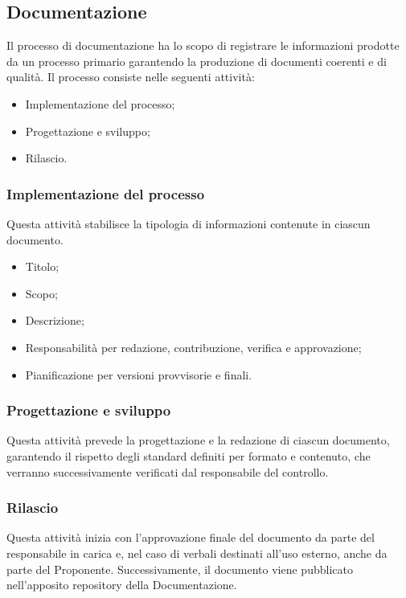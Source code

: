 \subsection{Documentazione}
\label{subsec:documentazione}
Il processo di documentazione ha lo scopo di registrare le informazioni prodotte da un processo primario garantendo la produzione di documenti coerenti e di qualità.
Il processo consiste nelle seguenti attività:
\begin{itemize}
    \item Implementazione del processo;
    \item Progettazione e sviluppo;
    \item Rilascio.
\end{itemize}

\subsubsection{Implementazione del processo}
\label{subsubsec:implementazione_processo}
Questa attività stabilisce la tipologia di informazioni contenute in ciascun documento.
\begin{itemize}
    \item Titolo;
    \item Scopo;
    \item Descrizione;
    \item Responsabilità per redazione, contribuzione, verifica e approvazione;
    \item Pianificazione per versioni provvisorie e finali.
\end{itemize}
\subsubsection{Progettazione e sviluppo}
Questa attività prevede la progettazione e la redazione di ciascun documento, garantendo il rispetto degli standard definiti per formato e contenuto, che verranno successivamente verificati dal responsabile del controllo.

\subsubsection{Rilascio}
Questa attività inizia con l'approvazione finale del documento da parte del responsabile in carica e, nel caso di verbali destinati all'uso esterno, anche da parte del Proponente. Successivamente, il documento viene pubblicato nell'apposito repository della Documentazione.

